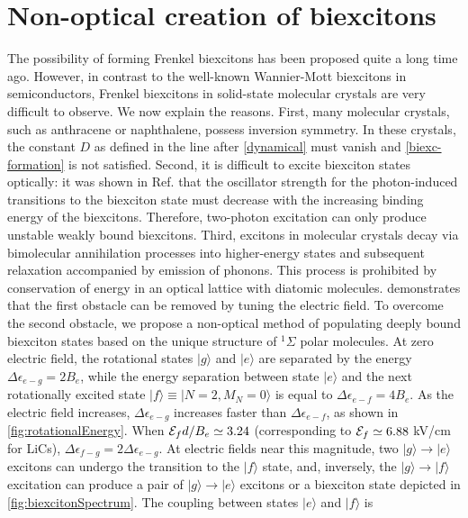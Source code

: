\section{Non-optical creation of biexcitons} 
The possibility of forming Frenkel biexcitons has been proposed quite a long time ago\cite{ biexciton-theory-2}.  
However, in 
contrast to the well-known Wannier-Mott biexcitons in semiconductors, Frenkel biexcitons in solid-state molecular
 crystals are very difficult to observe. 
We now explain the reasons. First, many molecular crystals, such as anthracene or naphthalene,  possess inversion
 symmetry. In these crystals, the constant $D$ as defined in the line after \autoref{dynamical} must vanish and 
\autoref{biexc-formation} is not satisfied. Second, it is difficult to excite biexciton states optically: it was shown
 in Ref.\cite{Ezaki1994} that the oscillator strength for the photon-induced transitions to the biexciton state must
 decrease with the increasing binding energy of the biexcitons. Therefore, two-photon excitation can only produce
 unstable weakly bound biexcitons. Third, excitons in molecular crystals decay via bimolecular annihilation processes
 into higher-energy states and subsequent relaxation accompanied by emission of phonons. This process is prohibited
 by conservation of energy in an optical lattice with diatomic molecules.   demonstrates
 that the first obstacle can be removed by tuning 
the electric field. To overcome the second obstacle, we propose a non-optical method of populating deeply bound
 biexciton states based on the unique structure of $^1\Sigma$ polar molecules. 
At zero electric field, the rotational states $|g\rangle$ and $|e\rangle$ are separated by the energy 
$\Delta \epsilon_{e - g}= 2 B_e$, while the energy separation between state $|e\rangle$ and the next rotationally
 excited state $|f\rangle \equiv |N=2, M_N = 0\rangle$ is equal to $\Delta \epsilon_{e- f}=4B_e$. As the electric field
 increases, $\Delta \epsilon_{e - g}$ increases faster than $\Delta \epsilon_{e - f}$, as shown in \autoref{fig:rotationalEnergy}.
When ${\cal E}_f d/B_e \simeq 3.24$ (corresponding to ${\cal E}_f \simeq 6.88$ kV/cm for LiCs), 
$\Delta \epsilon_{f - g} = 2 \Delta \epsilon_{e - g}$. At electric fields near this magnitude, two 
$| g \rangle \rightarrow | e \rangle$ excitons can undergo the transition to the $|f \rangle$ state, and, inversely, 
the $|g \rangle \rightarrow |f\rangle$ excitation can produce a pair of $|g\rangle \rightarrow |e \rangle$ excitons or a
 biexciton state depicted in \autoref{fig:biexcitonSpectrum}. The coupling between states $| e \rangle$ and $| f \rangle$ is

